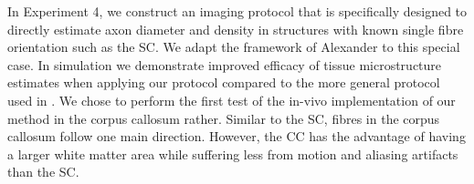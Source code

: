 In Experiment 4, we construct an imaging protocol that is specifically designed to directly estimate axon diameter and density in structures with known single fibre orientation such as the {\gls{SC}}. We adapt the framework of Alexander\cite{Alexander:2008} to this special case. In simulation we demonstrate improved efficacy of tissue microstructure estimates when applying our protocol compared to the more general protocol used in \cite{Alexander:2010}. We chose to perform the first test of the in-vivo implementation of our method  in the corpus callosum rather. Similar to the {\gls{SC}}, fibres in the corpus callosum follow one main direction. However, the \gls{CC} has the advantage of having a larger white matter area while suffering less from motion and aliasing artifacts than the {\gls{SC}}.
% 

